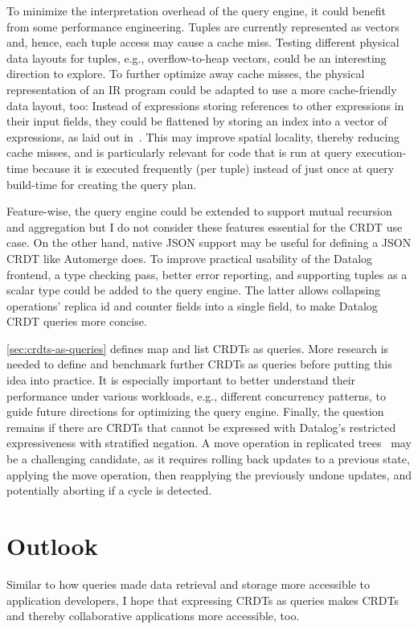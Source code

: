 To minimize the interpretation overhead of the query engine, it could
benefit from some performance engineering.
Tuples are currently represented as vectors and, hence, each tuple access
may cause a cache miss.
Testing different physical data layouts for tuples, e.g., overflow-to-heap
vectors\footnotemark{}, could be an interesting direction to explore.
To further optimize away cache misses, the physical representation of an
\ac{IR} program could be adapted to use a more cache-friendly data layout, too:
Instead of expressions storing references to other expressions in their
input fields, they could be flattened by storing an index into a vector of
expressions, as laid out in~\cite{sampson2023flattening}.
This may improve spatial locality, thereby reducing cache misses, and is
particularly relevant for code that is run at query execution-time because
it is executed frequently (per tuple) instead of just once at query build-time
for creating the query plan.


Feature-wise, the query engine could be extended to support mutual recursion
and aggregation but I do not consider these features essential for the
\ac{CRDT} use case. On the other hand, native JSON support may be useful for
defining a JSON \ac{CRDT} like Automerge does.
To improve practical usability of the Datalog frontend,
a type checking pass, better error reporting, and supporting tuples as a scalar
type could be added to the query engine.
The latter allows collapsing operations' replica id and counter fields
into a single field, to make Datalog \ac{CRDT} queries more concise.

\ref{sec:crdts-as-queries} defines map and list \acp{CRDT} as queries.
More research is needed to define and benchmark further \acp{CRDT} as queries
before putting this idea into practice.
It is especially important to better understand their performance under various
workloads, e.g., different concurrency patterns, to guide future directions for
optimizing the query engine.
Finally, the question remains if there are \acp{CRDT} that cannot be expressed
with Datalog's restricted expressiveness with stratified negation.
A move operation in replicated trees~\cite{moveop1,moveop2} may be a challenging
candidate, as it requires rolling back updates to a previous state,
applying the move operation, then reapplying the previously undone updates,
and potentially aborting if a cycle is detected.

\section{Outlook}\label{sec:outlook}

Similar to how queries made data retrieval and storage more accessible to
application developers, I hope that expressing \acp{CRDT} as queries
makes \acp{CRDT} and thereby collaborative applications more accessible, too.

